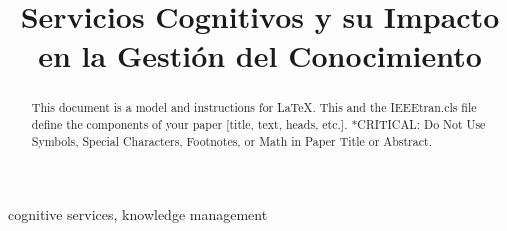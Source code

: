 \documentclass[conference]{IEEEtran}
\begin{document}
\title{Servicios Cognitivos y su Impacto en la Gestión del Conocimiento}

\author{
\and
{}
\and
{}
\and
{}
}

\maketitle

\begin{abstract}
This document is a model and instructions for \LaTeX.
This and the IEEEtran.cls file define the components of your paper [title, text, heads, etc.]. *CRITICAL: Do Not Use Symbols, Special Characters, Footnotes, 
or Math in Paper Title or Abstract.
\end{abstract}

\begin{IEEEkeywords}
cognitive services, knowledge management
\end{IEEEkeywords}











\end{document}
